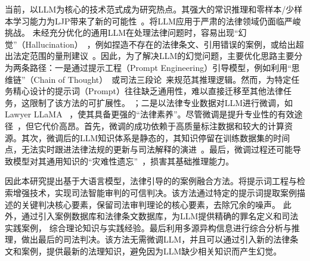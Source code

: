 当前，以LLM为核心的技术范式成为研究热点。其强大的常识推理和零样本/少样本学习能力为LJP带来了新的可能性~\cite{brown2020language,huang2022towards}。将LLM应用于严肃的法律领域仍面临严峻挑战。
未经充分优化的通用LLM在处理法律问题时，容易出现“幻觉”（Hallucination）~\cite{cui2023survey}，例如捏造不存在的法律条文、引用错误的案例，或给出超出法定范围的量刑建议~\cite{lewis2020retrieval}。因此，为了解决LLM的幻觉问题，主要优化思路主要分为两条路径：一是通过提示工程（Prompt Engineering）引导模型，例如利用“思维链”（Chain of Thought）~\cite{kojima2022large,izacard2021leveraging}或司法三段论~\cite{huang2023lawyer}来规范其推理逻辑。然而，为特定任务精心设计的提示词（Prompt）往往缺乏通用性，难以直接迁移至其他法律任务，这限制了该方法的可扩展性。
；二是以法律专业数据对LLM进行微调，如Lawyer LLaMA ~\cite{chen2020recall}，使其具备更强的“法律素养”。尽管微调是提升专业性的有效途径~\cite{hu2021lora,hu2022lora}，但它代价高昂。首先，微调的成功依赖于高质量标注数据和较大的计算资源。其次，微调后的LLM知识体系是静态的，其知识停留在训练数据集的时间点，无法实时跟进法律法规的更新与司法解释的演进~\cite{li2021prefix}。最后，微调过程还可能导致模型对其通用知识的“灾难性遗忘”~\cite{chen2020recall}，损害其基础推理能力。

因此本研究提出基于大语言模型，法律引导的的案例融合方法。将提示词工程与检索增强技术，实现司法智能审判的可信判决。该方法通过特定的提示词提取案例描述的关键判决核心要素，保留司法审判理论的核心要素，去除冗余的噪声。 此外，通过引入案例数据库和法律条文数据库，为LLM提供精确的罪名定义和司法实践案例， 综合理论知识与实践经验。最后利用多源异构信息进行综合分析与推理，做出最后的司法判决。该方法无需微调LLM，并且可以通过引入新的法律条文和案例，提供最新的法理知识，避免因为LLM缺少相关知识而产生幻觉。
